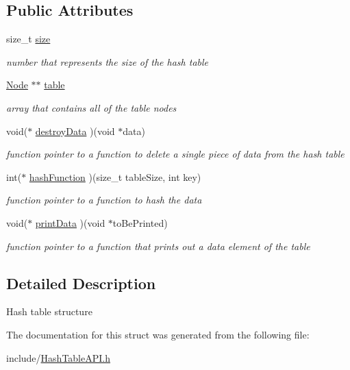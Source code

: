 \subsection*{Public Attributes}
\begin{DoxyCompactItemize}
\item 
\mbox{\label{structHTable_a6ede6f5f1f743298425e0832cfd24a4a}} 
size\+\_\+t \hyperlink{structHTable_a6ede6f5f1f743298425e0832cfd24a4a}{size}
\begin{DoxyCompactList}\small\item\em number that represents the size of the hash table \end{DoxyCompactList}\item 
\mbox{\label{structHTable_ad8f77b5519a173524eee87a5ebb380a0}} 
\hyperlink{structNode}{Node} $\ast$$\ast$ \hyperlink{structHTable_ad8f77b5519a173524eee87a5ebb380a0}{table}
\begin{DoxyCompactList}\small\item\em array that contains all of the table nodes \end{DoxyCompactList}\item 
\mbox{\label{structHTable_a05b3109f3bbfa3fd4b3e55c0bbd29b8a}} 
void($\ast$ \hyperlink{structHTable_a05b3109f3bbfa3fd4b3e55c0bbd29b8a}{destroy\+Data} )(void $\ast$data)
\begin{DoxyCompactList}\small\item\em function pointer to a function to delete a single piece of data from the hash table \end{DoxyCompactList}\item 
\mbox{\label{structHTable_a79abebe53db18bbf99f3938002b765e8}} 
int($\ast$ \hyperlink{structHTable_a79abebe53db18bbf99f3938002b765e8}{hash\+Function} )(size\+\_\+t table\+Size, int key)
\begin{DoxyCompactList}\small\item\em function pointer to a function to hash the data \end{DoxyCompactList}\item 
\mbox{\label{structHTable_a573abbe70757c842d491ff15d827c002}} 
void($\ast$ \hyperlink{structHTable_a573abbe70757c842d491ff15d827c002}{print\+Data} )(void $\ast$to\+Be\+Printed)
\begin{DoxyCompactList}\small\item\em function pointer to a function that prints out a data element of the table \end{DoxyCompactList}\end{DoxyCompactItemize}


\subsection{Detailed Description}
Hash table structure 

The documentation for this struct was generated from the following file\+:\begin{DoxyCompactItemize}
\item 
include/\hyperlink{HashTableAPI_8h}{Hash\+Table\+A\+P\+I.\+h}\end{DoxyCompactItemize}
